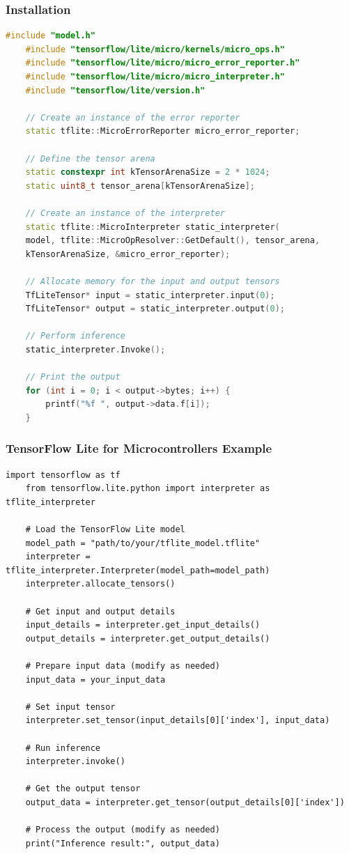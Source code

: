 \subsubsection{Installation}
\begin{lstlisting}[language=C++, caption={Installation code}, label={lst:installation_code}]
	#include "model.h"
	#include "tensorflow/lite/micro/kernels/micro_ops.h"
	#include "tensorflow/lite/micro/micro_error_reporter.h"
	#include "tensorflow/lite/micro/micro_interpreter.h"
	#include "tensorflow/lite/version.h"
	
	// Create an instance of the error reporter
	static tflite::MicroErrorReporter micro_error_reporter;
	
	// Define the tensor arena
	static constexpr int kTensorArenaSize = 2 * 1024;
	static uint8_t tensor_arena[kTensorArenaSize];
	
	// Create an instance of the interpreter
	static tflite::MicroInterpreter static_interpreter(
	model, tflite::MicroOpResolver::GetDefault(), tensor_arena,
	kTensorArenaSize, &micro_error_reporter);
	
	// Allocate memory for the input and output tensors
	TfLiteTensor* input = static_interpreter.input(0);
	TfLiteTensor* output = static_interpreter.output(0);
	
	// Perform inference
	static_interpreter.Invoke();
	
	// Print the output
	for (int i = 0; i < output->bytes; i++) {
		printf("%f ", output->data.f[i]);
	}
\end{lstlisting}

\subsubsection{TensorFlow Lite for Microcontrollers Example}

\begin{lstlisting}[caption={TensorFlow Lite for Microcontrollers Example}, label={lst:tf_lite_example}]
	import tensorflow as tf
	from tensorflow.lite.python import interpreter as tflite_interpreter
	
	# Load the TensorFlow Lite model
	model_path = "path/to/your/tflite_model.tflite"
	interpreter = tflite_interpreter.Interpreter(model_path=model_path)
	interpreter.allocate_tensors()
	
	# Get input and output details
	input_details = interpreter.get_input_details()
	output_details = interpreter.get_output_details()
	
	# Prepare input data (modify as needed)
	input_data = your_input_data
	
	# Set input tensor
	interpreter.set_tensor(input_details[0]['index'], input_data)
	
	# Run inference
	interpreter.invoke()
	
	# Get the output tensor
	output_data = interpreter.get_tensor(output_details[0]['index'])
	
	# Process the output (modify as needed)
	print("Inference result:", output_data)
\end{lstlisting}



